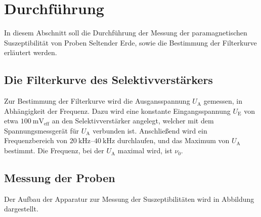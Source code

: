\section{Durchführung}

    In diesem Abschnitt soll die Durchführung der Messung der paramagnetischen Suszeptibilität
    von Proben Seltender Erde, sowie die Bestimmung der Filterkurve erläutert werden.

\subsection{Die Filterkurve des Selektivverstärkers}

    Zur Bestimmung der Filterkurve wird die Ausgansspannung $U_\text{A}$ gemessen, in Abhängigkeit der Frequenz.
    Dazu wird eine konstante Eingangsspannung $U_\text{E}$ von etwa $\SI{100}{\milli\volt_\text{eff}}$ 
    an den Selektivverstärker angelegt, welcher mit dem Spannungsmessgerät für $U_\text{A}$ verbunden ist.
    Anschließend wird ein Frequenzbereich von $\SIrange{20}{40}{\kilo\hertz}$ durchlaufen,
    und das Maximum von $U_\text{A}$ bestimmt.
    Die Frequenz, bei der $U_\text{A}$ maximal wird, 
    ist $\nu_0$.

\subsection{Messung der Proben}

    Der Aufbau der Apparatur zur Messung der Suszeptibilitäten wird in Abbildung %
    dargestellt.\\
    
